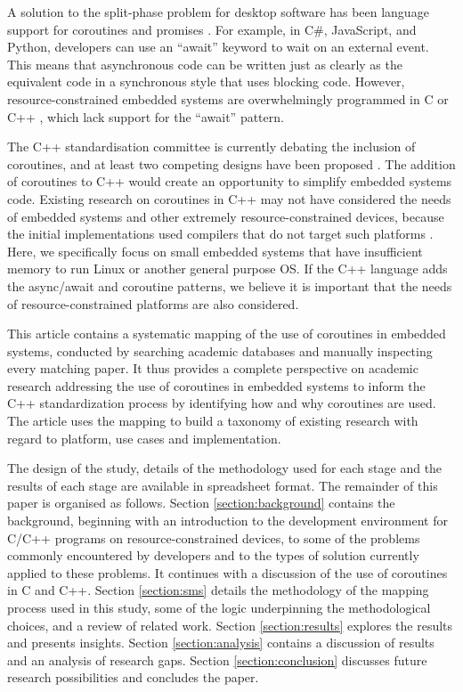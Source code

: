 \documentclass[format=acmsmall, review=false, screen=false]{acmart}
\begin{document}
A solution to the split-phase problem for desktop software has been language support for coroutines \cite{Conway1963, Knuth1968, Marlin1979} and promises \cite{Brodu2015, Liskov1988, Madsen2017}. For example, in C\#, JavaScript, and Python, developers can use an “await” keyword to wait on an external event. This means that asynchronous code can be written just as clearly as the equivalent code in a synchronous style that uses blocking code. However, resource-constrained embedded systems are overwhelmingly programmed in C or C++ \cite{AspenCore2017, Skerrett2017}, which lack support for the “await” pattern.

The C++ standardisation committee is currently debating the inclusion of coroutines, and at least two competing designs have been proposed \cite{ISO2017, Romer2018}. The addition of coroutines to C++ would create an opportunity to simplify embedded systems code. Existing research on coroutines in C++ may not have considered the needs of embedded systems and other extremely resource-constrained devices, because the initial implementations used compilers that do not target such platforms \cite{Mittelette2015}. Here, we specifically focus on small embedded systems that have insufficient memory to run Linux or another general purpose OS. If the C++ language adds the async/await and coroutine patterns, we believe it is important that the needs of resource-constrained platforms are also considered.

This article contains a systematic mapping of the use of coroutines in embedded systems, conducted by searching academic databases and manually inspecting every matching paper. It thus provides a complete perspective on academic research addressing the use of coroutines in embedded systems to inform the C++ standardization process by identifying how and why coroutines are used. The article uses the mapping to build a taxonomy of existing research with regard to platform, use cases and implementation.

The design of the study, details of the methodology used for each stage and the results of each stage are available in spreadsheet format.
The remainder of this paper is organised as follows. Section \ref{section:background} contains the background, beginning with an introduction to the development environment for C/C++ programs on resource-constrained devices, to some of the problems commonly encountered by developers and to the types of solution currently applied to these problems. It continues with a discussion of the use of coroutines in C and C++. Section \ref{section:sms} details the methodology of the mapping process used in this study, some of the logic underpinning the methodological choices, and a review of related work. Section \ref{section:results} explores the results and presents insights. Section \ref{section:analysis} contains a discussion of results and an analysis of research gaps. Section \ref{section:conclusion} discusses future research possibilities and concludes the paper.
\end{document}
